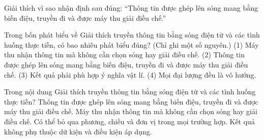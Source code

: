 \begin{bt}
Giải thích vì sao nhận định sau đúng: “Thông tin được ghép lên sóng mang bằng biến điệu, truyền đi và được máy thu giải điều chế.”
\end{bt}

\begin{ex}
Trong bốn phát biểu về Giải thích truyền thông tin bằng sóng điện từ và các tình huống thực tiễn, có bao nhiêu phát biểu đúng? (Chỉ ghi một số nguyên.) (1) Máy thu nhận thông tin mà không cần chọn sóng hay giải điều chế. (2) Thông tin được ghép lên sóng mang bằng biến điệu, truyền đi và được máy thu giải điều chế. (3) Kết quả phải phù hợp ý nghĩa vật lí. (4) Mọi đại lượng đều là vô hướng.
\end{ex}

\begin{ex}
Trong nội dung Giải thích truyền thông tin bằng sóng điện từ và các tình huống thực tiễn?
\choice
{\True Thông tin được ghép lên sóng mang bằng biến điệu, truyền đi và được máy thu giải điều chế.}
{Máy thu nhận thông tin mà không cần chọn sóng hay giải điều chế.}
{Có thể bỏ qua phương, chiều và đơn vị trong mọi trường hợp.}
{Kết quả không phụ thuộc dữ kiện và điều kiện áp dụng.}
\end{ex}

